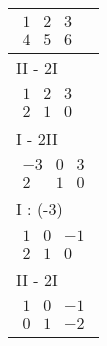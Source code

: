 \begin{longtable}{p{10cm}}
    $\displaystyle\begin{matrix}
                          1 & 2 & 3 \\
                          4 & 5 & 6
                      \end{matrix}$                                                            \\\hline
    II - 2I                                                                                \\\hline\pagebreak[0]
    $\displaystyle\begin{matrix}
                          1 & 2 & 3 \\
                          2 & 1 & 0
                      \end{matrix}$                                                            \\\hline
    I - 2II                                                                                \\\hline\pagebreak[0]
    $\displaystyle\begin{matrix}
                          -3 & 0 & 3 \\
                          2  & 1 & 0
                      \end{matrix}$                                                            \\\hline
    I : (-3)                                                                               \\\hline\pagebreak[0]
    $\displaystyle\begin{matrix}
                          1 & 0 & -1 \\
                          2 & 1 & 0
                      \end{matrix}$                                                            \\\hline
    II - 2I                                                                                \\\hline\pagebreak[0]
    $\displaystyle\begin{matrix}
                          1 & 0 & -1 \\
                          0 & 1 & -2
                      \end{matrix}$                                                            \\\hline
\end{longtable}

